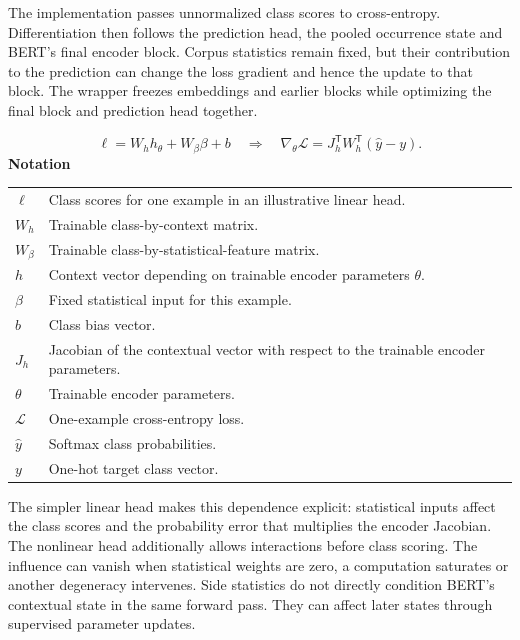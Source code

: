 \documentclass[10pt,letterpaper]{article}
\newcommand{\notlabel}{\noindent\textbf{Notation}\par\nobreak\vspace{4pt}}
\begin{document}
The implementation passes unnormalized class scores to cross-entropy. Differentiation then follows the prediction head, the pooled occurrence state and BERT's final encoder block. Corpus statistics remain fixed, but their contribution to the prediction can change the loss gradient and hence the update to that block. The wrapper freezes embeddings and earlier blocks while optimizing the final block and prediction head together.\par

\par\noindent\begin{minipage}{\linewidth}
\begin{equation}\label{eq:gradientbridge}
\ell=W_hh_\theta+W_\beta\beta+b\quad\Longrightarrow\quad\nabla_\theta\mathcal L=J_h^{\mathsf T}W_h^{\mathsf T}(\widehat y-y).
\end{equation}
\notlabel
{\fontsize{8.5}{10.5}\selectfont\setlength{\tabcolsep}{0pt}\renewcommand{\arraystretch}{1.12}
\begin{tabularx}{\linewidth}{@{}p{.14\linewidth}X@{}}
$\ell$ & Class scores for one example in an illustrative linear head.\\
$W_h$ & Trainable class-by-context matrix.\\
$W_\beta$ & Trainable class-by-statistical-feature matrix.\\
$h$ & Context vector depending on trainable encoder parameters \ensuremath{\theta}.\\
$\beta$ & Fixed statistical input for this example.\\
$b$ & Class bias vector.\\
$J_h$ & Jacobian of the contextual vector with respect to the trainable encoder parameters.\\
$\theta$ & Trainable encoder parameters.\\
$\mathcal L$ & One-example cross-entropy loss.\\
$\widehat y$ & Softmax class probabilities.\\
$y$ & One-hot target class vector.\\
\end{tabularx}}
\par\vspace{2pt}
\end{minipage}\par
The simpler linear head makes this dependence explicit: statistical inputs affect the class scores and the probability error that multiplies the encoder Jacobian. The nonlinear head additionally allows interactions before class scoring. The influence can vanish when statistical weights are zero, a computation saturates or another degeneracy intervenes. Side statistics do not directly condition BERT's contextual state in the same forward pass. They can affect later states through supervised parameter updates.\par
\end{document}
